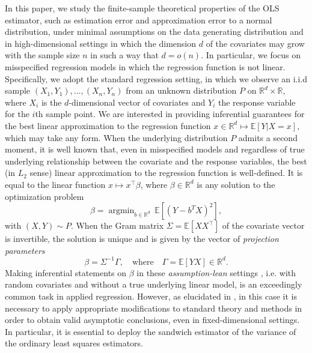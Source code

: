 \documentclass[11pt]{article}
\DeclareMathOperator*{\argmin}{argmin}
\begin{document}
In this paper, we study the finite-sample theoretical properties of the OLS estimator, such as estimation error and approximation error to a normal distribution, under minimal assumptions on the data generating distribution and in high-dimensional settings in which the dimension $d$ of the covariates may grow with the sample size $n$ in such a way that $d = o(n)$. In particular, we focus on misspecified regression models in which the regression function is not linear.
Specifically, we adopt the standard regression setting,  in which we observe an i.i.d sample $(X_1,Y_1),\ldots, (X_n,Y_n)$ from an unknown distribution $P$ on $\mathbb{R}^d \times \mathbb{R}$, where $X_i$ is the $d$-dimensional vector of covariates and $Y_i$ the response variable for the $i$th sample point. 
 We are interested in providing inferential guarantees for the best linear approximation to the  regression function $x \in \mathbb{R}^d \mapsto \mathbb{E}[Y|X=x]$, which may take any form.
When the underlying  distribution $P$ admits a second moment, it is well known \citep[see, e.g.][]{Buja14} that, even in misspecified models and regardless of true underlying relationship between the covariate and the response variables, the best (in $L_2$ sense) linear approximation to the regression function is well-defined. It is equal to the linear function  $x \mapsto x^\top \beta$, where $\beta \in \mathbb{R}^d$ is any solution to the optimization problem
\[
\beta = \argmin_{b \in \mathbb{R}^d}\, \mathbb{E}[(Y-b^T X)^2],
\]
with $(X,Y) \sim P$.
When the Gram matrix $\Sigma  = \mathbb{E}[X X^\top]$ of the covariate vector is invertible, the solution is unique and is given by the vector of {\it projection parameters}
\[
\beta = \Sigma^{-1}\Gamma, \quad \text{where} \quad  \Gamma = \mathbb{E}[YX]\in\mathbb{R}^d.
\]
Making inferential statements on $\beta$ in these {\it assumption-lean} settings \citep{Buja14}, i.e. with random covariates and without a true underlying linear model, is an exceedingly common task in applied regression. However, as elucidated in \cite{Buja14}, in this case it is necessary to apply appropriate modifications to standard theory and methods in order to obtain valid asymptotic conclusions, even in fixed-dimensional settings. In particular, it is essential to deploy the sandwich estimator \citep{White1980,Buja14} of the variance of the ordinary least squares estimators. 
\end{document}
